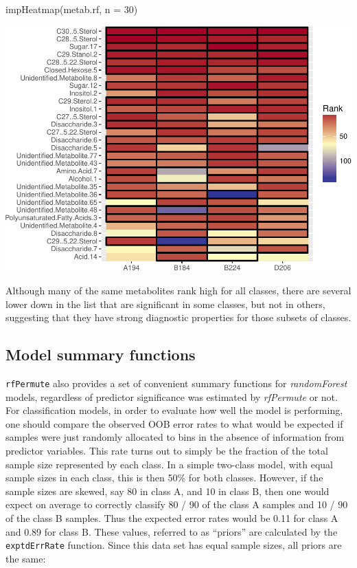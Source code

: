 \begin{Schunk}
\begin{Sinput}
impHeatmap(metab.rf, n = 30)
\end{Sinput}

\includegraphics{archer_files/figure-latex/impHeatmap-1} \end{Schunk}

Although many of the same metabolites rank high for all classes, there
are several lower down in the list that are significant in some classes,
but not in others, suggesting that they have strong diagnostic
properties for those subsets of classes.

\subsection{Model summary functions}\label{model-summary-functions}

\texttt{rfPermute} also provides a set of convenient summary functions
for \emph{randomForest} models, regardless of predictor significance was
estimated by \emph{rfPermute} or not. For classification models, in
order to evaluate how well the model is performing, one should compare
the observed OOB error rates to what would be expected if samples were
just randomly allocated to bins in the absence of information from
predictor variables. This rate turns out to simply be the fraction of
the total sample size represented by each class. In a simple two-class
model, with equal sample sizes in each class, this is then 50\% for both
classes. However, if the sample sizes are skewed, say 80 in class A, and
10 in class B, then one would expect on average to correctly classify 80
/ 90 of the class A samples and 10 / 90 of the class B samples. Thus the
expected error rates would be 0.11 for class A and 0.89 for class B.
These values, referred to as ``priors'' are calculated by the
\texttt{exptdErrRate} function. Since this data set has equal sample
sizes, all priors are the same:

